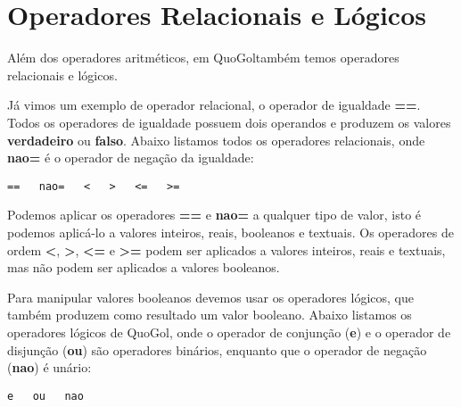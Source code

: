 \documentclass{report}
\newcommand{\Qgol}{QuoGol\;}
\begin{document}
\begin{enumerate}
\begin{comment}
\item Considere que um caixa de supermercado possui notas de R\$ 50,
R\$ 20, R\$ 10, R\$ 5 e R\$ 1. Escreva um programa que lê um valor
inteiro, que representa o troco que o caixa deve dar, e calcula o
menor número de notas que o caixa deve utilizar para obter esse valor.
O programa deve mostrar o número de notas de cada valor que serão
utilizados para fornecer o troco.
\begin{itemize}
	\item Exemplo de entrada:
\begin{verbatim}
87
\end{verbatim}
	\item Exemplo de saída:
\begin{verbatim}
1 nota(s) de R$ 50
1 nota(s) de R$ 20
1 nota(s) de R$ 10
1 nota(s) de R$  5
2 nota(s) de R$  1
\end{verbatim}
\end{itemize}
\end{comment}
\end{enumerate}



\section{Operadores Relacionais e Lógicos}

Além dos operadores aritméticos, em \Qgol também temos operadores
relacionais e lógicos.

Já vimos um exemplo de operador relacional, o operador de igualdade
\textbf{==}. Todos os operadores de igualdade possuem dois operandos
e produzem os valores \textbf{verdadeiro} ou \textbf{falso}. Abaixo
listamos todos os operadores relacionais, onde \textbf{nao=} é o
operador de negação da igualdade:
\begin{verbatim}
==   nao=   <   >   <=   >=
\end{verbatim}

Podemos aplicar os operadores \textbf{==} e \textbf{nao=} a qualquer
tipo de valor, isto é podemos aplicá-lo a valores inteiros, reais,
booleanos e textuais. Os operadores de ordem {\bf <}, {\bf >}, {\bf <=} e {\bf >=}
podem ser aplicados a valores inteiros, reais e textuais, mas não podem ser
aplicados a valores booleanos. 

Para manipular valores booleanos devemos usar os operadores lógicos,
que também produzem como resultado um valor booleano.
Abaixo listamos os operadores lógicos de \Qgol, onde o operador
de conjunção (\textbf{e}) e o operador de disjunção (\textbf{ou})
são operadores binários, enquanto que o operador de negação (\textbf{nao})
é unário:
\begin{verbatim}
e   ou   nao
\end{verbatim}
\end{document}
